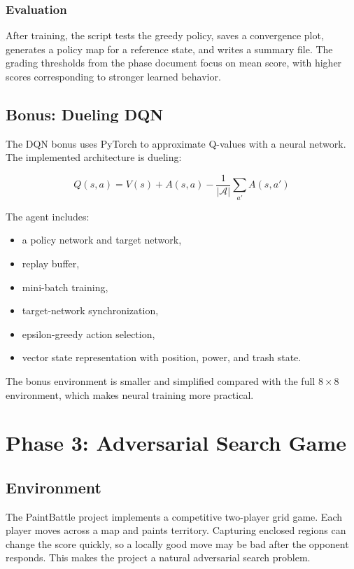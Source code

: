 \documentclass[11pt,a4paper]{article}
\begin{document}
\subsubsection{Evaluation}

After training, the script tests the greedy policy, saves a convergence plot, generates a policy map for a reference state, and writes a summary file. The grading thresholds from the phase document focus on mean score, with higher scores corresponding to stronger learned behavior.

\subsection{Bonus: Dueling DQN}

The DQN bonus uses PyTorch to approximate Q-values with a neural network. The implemented architecture is dueling:

\begin{equation}
    Q(s,a) = V(s) + A(s,a) - \frac{1}{|\mathcal{A}|}\sum_{a'} A(s,a')
\end{equation}

The agent includes:

\begin{itemize}[leftmargin=*]
    \item a policy network and target network,
    \item replay buffer,
    \item mini-batch training,
    \item target-network synchronization,
    \item epsilon-greedy action selection,
    \item vector state representation with position, power, and trash state.
\end{itemize}

The bonus environment is smaller and simplified compared with the full \(8 \times 8\) environment, which makes neural training more practical.

\section{Phase 3: Adversarial Search Game}

\subsection{Environment}

The PaintBattle project implements a competitive two-player grid game. Each player moves across a map and paints territory. Capturing enclosed regions can change the score quickly, so a locally good move may be bad after the opponent responds. This makes the project a natural adversarial search problem.
\end{document}

